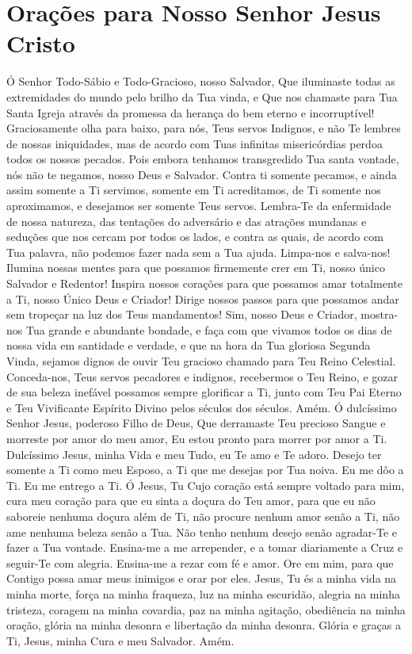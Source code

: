 \documentclass{subfiles}
\begin{document}

\section*{Orações para Nosso Senhor Jesus Cristo}

Ó Senhor Todo-Sábio e Todo-Gracioso, nosso Salvador, Que iluminaste todas as
extremidades do mundo pelo brilho da Tua vinda, e Que nos chamaste para Tua
Santa Igreja através da promessa da herança do bem eterno e incorruptível!
Graciosamente olha para baixo, para nós, Teus servos Indignos, e não Te lembres
de nossas iniquidades, mas de acordo com Tuas infinitas misericórdias perdoa
todos os nossos pecados. Pois embora tenhamos transgredido Tua santa vontade,
nós não te negamos, nosso Deus e Salvador. Contra ti somente pecamos, e ainda
assim somente a Ti servimos, somente em Ti acreditamos, de Ti somente nos
aproximamos, e desejamos ser somente Teus servos. Lembra-Te da enfermidade de
nossa natureza, das tentações do adversário e das atrações mundanas e seduções
que nos cercam por todos os lados, e contra as quais, de acordo com Tua palavra,
não podemos fazer nada sem a Tua ajuda. Limpa-nos e salva-nos! Ilumina nossas
mentes para que possamos firmemente crer em Ti, nosso único Salvador e Redentor!
Inspira nossos corações para que possamos amar totalmente a Ti, nosso Único Deus
e Criador! Dirige nossos passos para que possamos andar sem tropeçar na luz dos
Teus mandamentos! Sim, nosso Deus e Criador, mostra-nos Tua grande e abundante
bondade, e faça com que vivamos todos os dias de nossa vida em santidade e
verdade, e que na hora da Tua gloriosa Segunda Vinda, sejamos dignos de ouvir
Teu gracioso chamado para Teu Reino Celestial. Conceda-nos, Teus servos
pecadores e indignos, recebermos o Teu Reino, e gozar de sua beleza inefável
possamos sempre glorificar a Ti, junto com Teu Pai Eterno e Teu Vivificante
Espírito Divino pelos séculos dos séculos. Amém. Ó dulcíssimo Senhor Jesus,
poderoso Filho de Deus, Que derramaste Teu precioso Sangue e morreste por amor
do meu amor, Eu estou pronto para morrer por amor a Ti. Dulcíssimo Jesus, minha
Vida e meu Tudo, eu Te amo e Te adoro. Desejo ter somente a Ti como meu Esposo,
a Ti que me desejas por Tua noiva. Eu me dôo a Ti. Eu me entrego a Ti. Ó Jesus,
Tu Cujo coração está sempre voltado para mim, cura meu coração para que eu sinta
a doçura do Teu amor, para que eu não saboreie nenhuma doçura além de Ti, não
procure nenhum amor senão a Ti, não ame nenhuma beleza senão a Tua. Não tenho
nenhum desejo senão agradar-Te e fazer a Tua vontade. Ensina-me a me arrepender,
e a tomar diariamente a Cruz e seguir-Te com alegria. Ensina-me a rezar com fé e
amor. Ore em mim, para que Contigo possa amar meus inimigos e orar por eles.
Jesus, Tu és a minha vida na minha morte, força na minha fraqueza, luz na minha
escuridão, alegria na minha tristeza, coragem na minha covardia, paz na minha
agitação, obediência na minha oração, glória na minha desonra e libertação da
minha desonra. Glória e graças a Ti, Jesus, minha Cura e meu Salvador. Amém.
\end{document}
